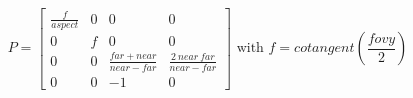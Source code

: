 \documentclass{article}
\begin{document}
$$
  P =
\left[ \begin{array}{cccc}
    \frac{f}{aspect}  & 0 & 0 & 0\\
    0 & f & 0 & 0\\
    0 & 0 &  \frac{far+near}{near-far} & \frac{2~near~far}{near-far} \\
    0 & 0 & -1 & 0
  \end{array} \right] \mbox{ with } f = cotangent(\frac{fovy}{2})
$$
\end{document}
